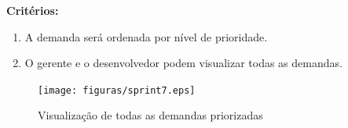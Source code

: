 \textbf{Critérios:}
\begin{enumerate}
	\item A demanda será ordenada por nível de prioridade.
	\item O gerente e o desenvolvedor podem visualizar todas as demandas. 
\end{enumerate}

\begin{figure}[H]
    \centering
	\texttt{[image: figuras/sprint7.eps]}
    \caption{Visualização de todas as demandas priorizadas}
    \label{}
\end{figure}